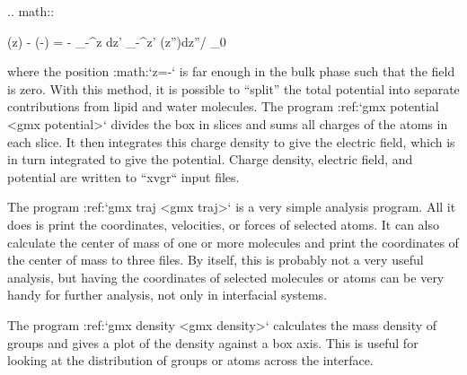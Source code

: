.. math::

   \psi(z) - \psi(-\infty) = - \int_{-\infty}^z dz' \int_{-\infty}^{z'} \rho(z'')dz''/ \epsilon_0 
   \label{eqn:elpotgr}

where the position :math:`z=-\infty` is far enough in the bulk phase
such that the field is zero. With this method, it is possible to “split”
the total potential into separate contributions from lipid and water
molecules. The program :ref:`gmx potential <gmx potential>` divides the box in slices
and sums all charges of the atoms in each slice. It then integrates this
charge density to give the electric field, which is in turn integrated
to give the potential. Charge density, electric field, and potential are
written to ``xvgr`` input files.

The program :ref:`gmx traj <gmx traj>` is a
very simple analysis program. All it does is print the coordinates,
velocities, or forces of selected atoms. It can also calculate the
center of mass of one or more molecules and print the coordinates of the
center of mass to three files. By itself, this is probably not a very
useful analysis, but having the coordinates of selected molecules or
atoms can be very handy for further analysis, not only in interfacial
systems.

The program :ref:`gmx density <gmx density>`
calculates the mass density of groups and gives a plot of the density
against a box axis. This is useful for looking at the distribution of
groups or atoms across the interface.


